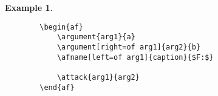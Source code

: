 \documentclass{article}
\newtheorem{example}{Example}
\begin{document}
    \begin{example}~
    \begin{verbatim}
        \begin{af}
            \argument{arg1}{a}
            \argument[right=of arg1]{arg2}{b}
            \afname[left=of arg1]{caption}{$F:$}
    
            \attack{arg1}{arg2}
        \end{af}    
    \end{verbatim}

    \begin{center}
        \begin{af}
    
        \end{af}    
    \end{center}
    \end{example}
\end{document}
